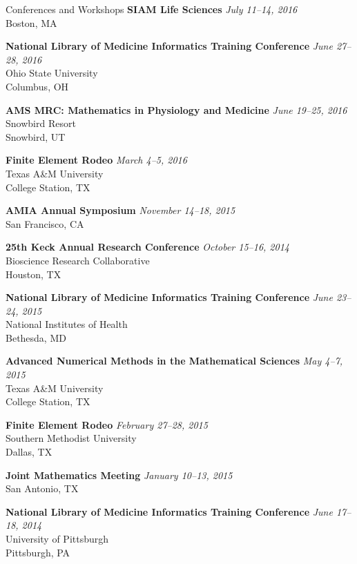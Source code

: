 \documentclass{resume} %
\begin{document}
\begin{rSection}{Conferences and Workshops}
{\bf SIAM Life Sciences} \hfill {\em July 11--14, 2016} \\
{\small Boston, MA}

{\bf National Library of Medicine Informatics Training Conference} \hfill {\em June 27--28, 2016} \\
{\small Ohio State University\\
Columbus, OH}

{\bf AMS MRC: Mathematics in Physiology and Medicine} \hfill {\em June 19--25, 2016} \\
{\small Snowbird Resort \\
Snowbird, UT}

{\bf Finite Element Rodeo} \hfill {\em March 4--5, 2016} \\
{\small Texas A\&M University \\
College Station, TX}

{\bf AMIA Annual Symposium} \hfill {\em November 14--18, 2015} \\
{\small San Francisco, CA}

{\bf 25th Keck Annual Research Conference} \hfill {\em October 15--16, 2014} \\
{\small Bioscience Research Collaborative \\
Houston, TX} 

{\bf National Library of Medicine Informatics Training Conference} \hfill {\em June 23--24, 2015} \\
{\small National Institutes of Health \\
Bethesda, MD}

{\bf Advanced Numerical Methods in the Mathematical Sciences} \hfill {\em May 4--7, 2015}\\
{\small Texas A\&M University \\
College Station, TX}

{\bf Finite Element Rodeo} \hfill {\em February 27--28, 2015} \\
{\small Southern Methodist University \\
Dallas, TX}

{\bf Joint Mathematics Meeting} \hfill {\em January 10--13, 2015} \\
{\small San Antonio, TX}

{\bf National Library of Medicine Informatics Training Conference} \hfill {\em June 17--18, 2014} \\
{\small University of Pittsburgh \\
Pittsburgh, PA}


\end{rSection}
\end{document}
